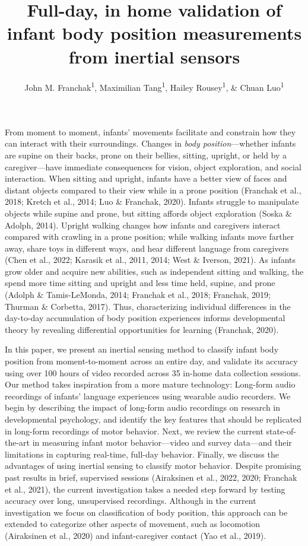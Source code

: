 \documentclass[
  man]{apa6}
\title{Full-day, in home validation of infant body position measurements from inertial sensors}
\author{John M. Franchak\textsuperscript{1}, Maximilian Tang\textsuperscript{1}, Hailey Rousey\textsuperscript{1}, \& Chuan Luo\textsuperscript{1}}
\date{}
\affiliation{\phantom{0}}
\begin{document}
\maketitle

From moment to moment, infants' movements facilitate and constrain how they can interact with their surroundings. Changes in \emph{body position}---whether infants are supine on their backs, prone on their bellies, sitting, upright, or held by a caregiver---have immediate consequences for vision, object exploration, and social interaction. When sitting and upright, infants have a better view of faces and distant objects compared to their view while in a prone position (Franchak et al., 2018; Kretch et al., 2014; Luo \& Franchak, 2020). Infants struggle to manipulate objects while supine and prone, but sitting affords object exploration (Soska \& Adolph, 2014). Upright walking changes how infants and caregivers interact compared with crawling in a prone position; while walking infants move farther away, share toys in different ways, and hear different language from caregivers (Chen et al., 2022; Karasik et al., 2011, 2014; West \& Iverson, 2021). As infants grow older and acquire new abilities, such as independent sitting and walking, the spend more time sitting and upright and less time held, supine, and prone (Adolph \& Tamis-LeMonda, 2014; Franchak et al., 2018; Franchak, 2019; Thurman \& Corbetta, 2017). Thus, characterizing individual differences in the day-to-day accumulation of body position experiences informs developmental theory by revealing differential opportunities for learning (Franchak, 2020).

In this paper, we present an inertial sensing method to classify infant body position from moment-to-moment across an entire day, and validate its accuracy using over 100 hours of video recorded across 35 in-home data collection sessions. Our method takes inspiration from a more mature technology: Long-form audio recordings of infants' language experiences using wearable audio recorders. We begin by describing the impact of long-form audio recordings on research in developmental psychology, and identify the key features that should be replicated in long-form recordings of motor behavior. Next, we review the current state-of-the-art in measuring infant motor behavior---video and survey data---and their limitations in capturing real-time, full-day behavior. Finally, we discuss the advantages of using inertial sensing to classify motor behavior. Despite promising past results in brief, supervised sessions (Airaksinen et al., 2022, 2020; Franchak et al., 2021), the current investigation takes a needed step forward by testing accuracy over long, unsupervised recordings. Although in the current investigation we focus on classification of body position, this approach can be extended to categorize other aspects of movement, such as locomotion (Airaksinen et al., 2020) and infant-caregiver contact (Yao et al., 2019).
\end{document}
